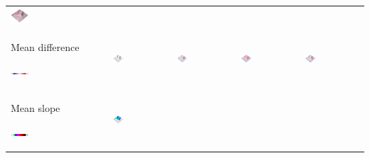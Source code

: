 \documentclass[prodmode,acmtochi]{acmsmall} %
\begin{document}
\begin{table}
{\begin{tabular}{m{} m{} m{} m{} m{}}
\includegraphics[width=0.19\textwidth]{images/render_3d/stdev/stdev_regression_difference_series_3.png}\\
%
Mean difference \par \vspace{0.5em} \includegraphics[width=0.19\textwidth]{images/legends/diff_legend_1.pdf} & 
\includegraphics[width=0.19\textwidth]{images/render_3d/dem_difference_1.png} &
\includegraphics[width=0.19\textwidth]{images/render_3d/mean_dem_regression_difference_1.png} &
\includegraphics[width=0.19\textwidth]{images/render_3d/mean_dem_regression_difference_2.png} &
\includegraphics[width=0.19\textwidth]{images/render_3d/mean_dem_regression_difference_3.png}\\
%
Mean slope \par \vspace{0.5em} \includegraphics[width=0.19\textwidth]{images/legends/slope_legend.pdf} & 
\includegraphics[width=0.19\textwidth]{images/render_3d/slope_1.png} &

\end{tabular}}
\end{table}
\end{document}
